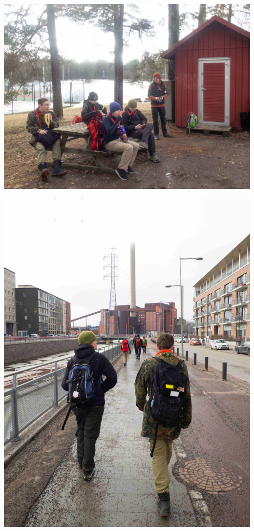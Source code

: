 \begin{multicols}{2}
	\vspace*{0.16cm}
	\noindent\includegraphics[width=\linewidth]{assets/nahkaliljamustikkamaa}

	\noindent\includegraphics[width=\linewidth]{assets/nahkaliljakalasatama}


\end{multicols}

